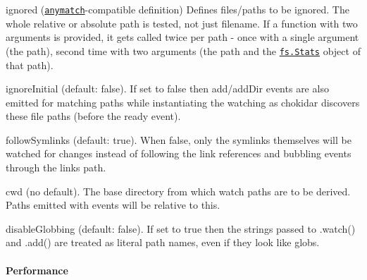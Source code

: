 \begin{DoxyItemize}
\item {\ttfamily ignored} (\href{https://github.com/es128/anymatch}{\tt anymatch}-\/compatible definition) Defines files/paths to be ignored. The whole relative or absolute path is tested, not just filename. If a function with two arguments is provided, it gets called twice per path -\/ once with a single argument (the path), second time with two arguments (the path and the \href{http://nodejs.org/api/fs.html#fs_class_fs_stats}{\tt {\ttfamily fs.\+Stats}} object of that path).
\item {\ttfamily ignore\+Initial} (default\+: {\ttfamily false}). If set to {\ttfamily false} then {\ttfamily add}/{\ttfamily add\+Dir} events are also emitted for matching paths while instantiating the watching as chokidar discovers these file paths (before the {\ttfamily ready} event).
\item {\ttfamily follow\+Symlinks} (default\+: {\ttfamily true}). When {\ttfamily false}, only the symlinks themselves will be watched for changes instead of following the link references and bubbling events through the link\textquotesingle{}s path.
\item {\ttfamily cwd} (no default). The base directory from which watch {\ttfamily paths} are to be derived. Paths emitted with events will be relative to this.
\item {\ttfamily disable\+Globbing} (default\+: {\ttfamily false}). If set to {\ttfamily true} then the strings passed to {\ttfamily .watch()} and {\ttfamily .add()} are treated as literal path names, even if they look like globs.
\end{DoxyItemize}

\paragraph*{Performance}


